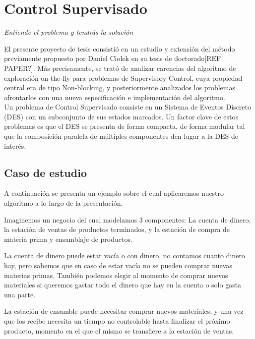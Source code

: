\section{Control Supervisado}
{\begin{small}%
\begin{flushright}%
\it
Entiende el problema y tendrás la solución
\end{flushright}%
\end{small}%
\vspace{.5cm}}
El presente proyecto de tesis consistió en un estudio y extensión del método previamente propuesto por Daniel Ciolek en su tesis de doctorado[REF PAPER?]. Más precisamente, se trató de analizar carencias del algoritmo de exploración on-the-fly para problemas de Supervisory Control, cuya propiedad central era de tipo Non-blocking, y posteriormente analizados los problemas afrontarlos con una nueva especificación e implementación del algoritmo.
\\
Un problema de Control Supervisado consiste en un Sistema de Eventos Discreto (DES) con un subconjunto de sus estados marcados. Un factor clave de estos problemas es que el DES se presenta de forma compacta, de forma modular tal que la composición paralela de múltiples componentes den lugar a la DES de interés.
\\

\subsection{Caso de estudio}
A continuación se presenta un ejemplo sobre el cual aplicaremos nuestro algoritmo a lo largo de la presentación. 

Imaginemos un negocio del cual modelamos 3 componentes: La cuenta de dinero, la estación de ventas de productos terminados, y la estación de compra de materia prima y ensamblaje de productos.

La cuenta de dinero puede estar vacía o con dinero, no contamos cuanto dinero hay, pero sabemos que en caso de estar vacía no se pueden comprar nuevas materias primas. También podemos elegir al momento de comprar nuevos materiales si queremos gastar todo el dinero que hay en la cuenta o solo gasta una parte.

La estación de ensamble puede necesitar comprar nuevos materiales, y una vez que los recibe necesita un tiempo no controlable hasta finalizar el próximo producto, momento en el que el mismo se transfiere a la estación de ventas.

